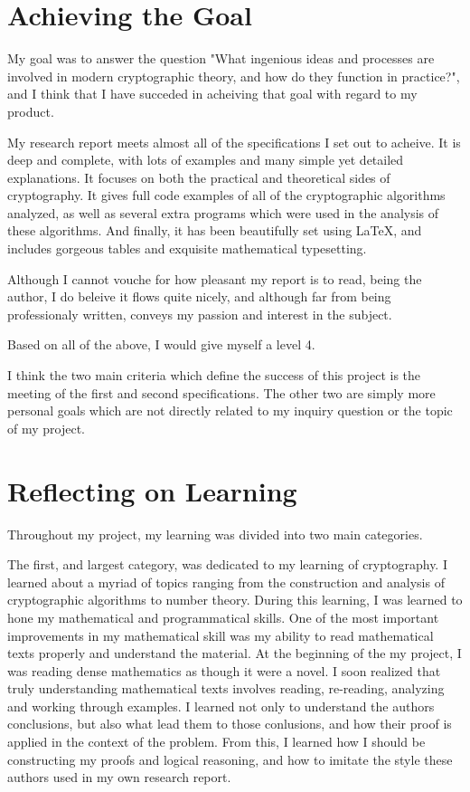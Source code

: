 \documentclass[12pt, a4paper, draft]{report}
\begin{document}
\section*{Achieving the Goal}

My goal was to answer the question "What ingenious ideas and processes
are involved in modern cryptographic theory, and how do they function
in practice?", and I think that I have succeded in acheiving that goal
with regard to my product.


My research report meets almost all of the specifications I set out to
acheive. It is deep and complete, with lots of examples and many
simple yet detailed explanations. It focuses on both the practical
and theoretical sides of cryptography. It gives full code examples
of all of the cryptographic algorithms analyzed, as well as several
extra programs which were used in the analysis of these algorithms.
And finally, it has been beautifully set using {\LaTeX}, and includes
gorgeous tables and exquisite mathematical typesetting.

Although I cannot vouche for how pleasant my report is to read, being
the author, I do beleive it flows quite nicely, and although far from
being professionaly written, conveys my passion and interest in the
subject.

Based on all of the above, I would give myself a level 4.


I think the two main criteria which define the success of this project
is the meeting of the first and second specifications. The other two
are simply more personal goals which are not directly related to my
inquiry question or the topic of my project.

\section*{Reflecting on Learning}

Throughout my project, my learning was divided into two main
categories.

The first, and largest category, was dedicated to my learning of
cryptography. I learned about a myriad of topics ranging from
the construction and analysis of cryptographic algorithms to number
theory. During this learning, I was learned to hone my mathematical and
programmatical skills. One of the most important improvements
in my mathematical skill was my ability to read mathematical texts
properly and understand the material. At the beginning of the my project,
I was reading dense mathematics as though it were a novel. I soon realized
that truly understanding mathematical texts involves reading, re-reading,
analyzing and working through examples. I learned not only to understand
the authors conclusions, but also what lead them to those conlusions, and
how their proof is applied in the context of the problem. From this, I
learned how I should be constructing my proofs and logical reasoning, and
how to imitate the style these authors used in my own research report.
\end{document}
